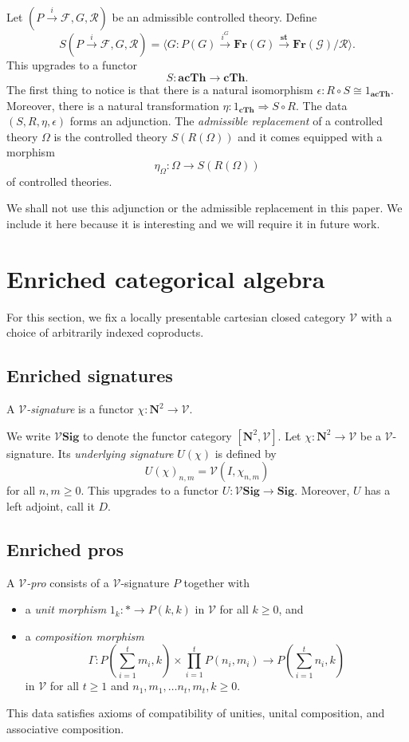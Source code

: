 \documentclass{tac}
\begin{document}
Let $(P\xrightarrow{i}\mathcal{F},G,\mathcal{R})$ be an admissible controlled theory. Define 
\[
S(P\xrightarrow{i}\mathcal{F},G,\mathcal{R})=\langle G:P(G)\xrightarrow{i^G}\mathbf{Fr}(G)\xrightarrow{\mathbf{st}}\mathbf{Fr}(\mathcal{G})/\mathcal{R}\rangle.
\]
This upgrades to a functor
\[
S:\mathbf{acTh}\to\mathbf{cTh}.
\]
The first thing to notice is that there is a natural isomorphism $\epsilon:R\circ S\cong 1_{\mathbf{acTh}}$. Moreover, there is a natural transformation $\eta:1_{\mathbf{cTh}}\Rightarrow S\circ R$. The data $(S,R,\eta,\epsilon)$ forms an adjunction. The \emph{admissible replacement} of a controlled theory $\Omega$ is the controlled theory $S(R(\Omega))$ and it comes equipped with a morphism
\[
\eta_{\Omega}:\Omega\to S(R(\Omega))
\]
of controlled theories.

We shall not use this adjunction or the admissible replacement in this paper. We include it here because it is interesting and we will require it in future work.

 \section{Enriched categorical algebra}
 For this section, we fix a locally presentable cartesian closed category $\mathcal{V}$ with a choice of arbitrarily indexed coproducts.
\subsection*{Enriched signatures}
 \begin{definition}
    A \emph{$\mathcal{V}$-signature} is a functor $\chi:\mathbf{N}^2\to \mathcal{V}$.
 \end{definition}

We write $\mathcal{V}\mathbf{Sig}$ to denote the functor category $[\mathbf{N}^2,\mathcal{V}]$. Let $\chi:\mathbf{N}^2\to\mathcal{V}$ be a $\mathcal{V}$-signature. Its \emph{underlying signature} $U(\chi)$ is defined by
\[
U(\chi)_{n,m}=\mathcal{V}(I,\chi_{n,m})
\]
for all $n,m\geq 0$. This upgrades to a functor $U:\mathcal{V}\mathbf{Sig}\to\mathbf{Sig}$. Moreover, $U$ has a left adjoint, call it $D$.

\subsection*{Enriched pros}
\begin{definition}
A \emph{$\mathcal{V}$-pro} consists of a $\mathcal{V}$-signature $P$ together with
\begin{itemize}
    \item a \emph{unit morphism} $1_k:*\to P(k,k)$ in $\mathcal{V}$ for all $k\geq 0$, and
    \item a \emph{composition morphism} 
    \[
    \Gamma:P(\sum_{i=1}^tm_i,k)\times\prod_{i=1}^tP(n_i,m_i)\to P(\sum_{i=1}^tn_i,k)
    \]
    in $\mathcal{V}$ for all $t\geq 1$ and $n_1,m_1,\dots n_t,m_t,k\geq 0$.
\end{itemize}
This data satisfies axioms of compatibility of unities, unital composition, and associative composition.
\end{definition}
\end{document}
